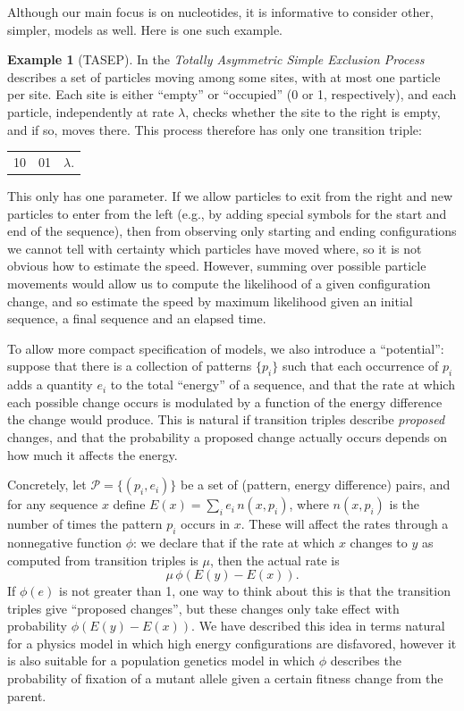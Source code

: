 \documentclass{article}
\newcommand{\calP}{\mathcal{P}}  %
\theoremstyle{plain}
\theoremstyle{definition}
\newtheorem{example}{Example}[section]
\begin{document}
Although our main focus is on nucleotides,
it is informative to consider other, simpler, models as well.
Here is one such example.

\begin{example}[TASEP]
  In the \emph{Totally Asymmetric Simple Exclusion Process}
  describes a set of particles moving among some sites,
  with at most one particle per site.
  Each site is either ``empty'' or ``occupied''
  (0 or 1, respectively),
  and each particle, independently at rate $\lambda$,
  checks whether the site to the right is empty,
  and if so, moves there.
  This process therefore has only one transition triple:

  \begin{center}
    \begin{tabular}{c@{\quad$\to$\quad}c@{\quad at rate\quad }c}
      10  &   01   &  $\lambda$.
    \end{tabular}
  \end{center}

  \noindent
  This only has one parameter.
  If we allow particles to exit from the right and new particles to enter from the left
  (e.g., by adding special symbols for the start and end of the sequence),
  then from observing only starting and ending configurations
  we cannot tell with certainty which particles have moved where,
  so it is not obvious how to estimate the speed.
  However, summing over possible particle movements would allow us to
  compute the likelihood of a given configuration change,
  and so estimate the speed by maximum likelihood
  given an initial sequence, a final sequence and an elapsed time.

\end{example}


To allow more compact specification of models,
we also introduce a ``potential'':
suppose that there is a collection of patterns $\{p_i\}$
such that each occurrence of $p_i$ adds a quantity $e_i$ to the total ``energy'' of a sequence,
and that the rate at which each possible change occurs is modulated by a function of the energy difference the change would produce.
This is natural if transition triples describe \emph{proposed} changes,
and that the probability a proposed change actually occurs depends on how much it affects the energy.

Concretely, let $\calP = \{(p_i, e_i)\}$ be a set of (pattern, energy difference) pairs,
and for any sequence $x$ define
$E(x) = \sum_i e_i\, n(x,p_i)$,
where $n(x,p_i)$ is the number of times the pattern $p_i$ occurs in $x$.
These will affect the rates through a nonnegative function $\phi$:
we declare that if the rate at which $x$ changes to $y$ as computed
from transition triples is $\mu$,
then the actual rate is
\[
    \mu \, \phi\left(E(y) - E(x)\right) .
\]
If $\phi(e)$ is not greater than 1, one way to think about this is that
the transition triples give ``proposed changes'',
but these changes only take effect with probability $\phi(E(y) - E(x))$.
We have described this idea in terms natural for a physics model
in which high energy configurations are disfavored,
however it is also suitable for a population genetics model
in which $\phi$ describes the probability of fixation of a mutant allele
given a certain fitness change from the parent.
\end{document}
